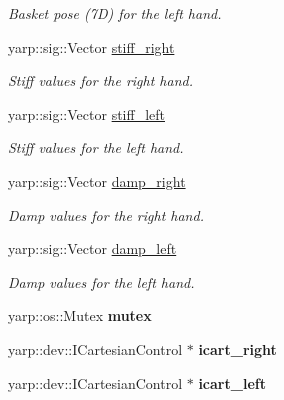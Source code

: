 \begin{DoxyCompactItemize}
\begin{DoxyCompactList}\small\item\em Basket pose (7D) for the left hand. \end{DoxyCompactList}\item 
yarp\+::sig\+::\+Vector \hyperlink{classGraspExecution_a1181e7d2a8259d7bd7386e1efa004901}{stiff\+\_\+right}\label{classGraspExecution_a1181e7d2a8259d7bd7386e1efa004901}

\begin{DoxyCompactList}\small\item\em Stiff values for the right hand. \end{DoxyCompactList}\item 
yarp\+::sig\+::\+Vector \hyperlink{classGraspExecution_aadb33fbb2a639113629e6d2b49c164f4}{stiff\+\_\+left}\label{classGraspExecution_aadb33fbb2a639113629e6d2b49c164f4}

\begin{DoxyCompactList}\small\item\em Stiff values for the left hand. \end{DoxyCompactList}\item 
yarp\+::sig\+::\+Vector \hyperlink{classGraspExecution_a9a2586409693c80b141daa30ae0e1b5b}{damp\+\_\+right}\label{classGraspExecution_a9a2586409693c80b141daa30ae0e1b5b}

\begin{DoxyCompactList}\small\item\em Damp values for the right hand. \end{DoxyCompactList}\item 
yarp\+::sig\+::\+Vector \hyperlink{classGraspExecution_a2a5d14ee157f71328424c9822d48b67a}{damp\+\_\+left}\label{classGraspExecution_a2a5d14ee157f71328424c9822d48b67a}

\begin{DoxyCompactList}\small\item\em Damp values for the left hand. \end{DoxyCompactList}\item 
yarp\+::os\+::\+Mutex {\bfseries mutex}\label{classGraspExecution_a7d77b561dd2573fa42a28b760c030a63}

\item 
yarp\+::dev\+::\+I\+Cartesian\+Control $\ast$ {\bfseries icart\+\_\+right}\label{classGraspExecution_a39489640372dcf1928e854c20742f35e}

\item 
yarp\+::dev\+::\+I\+Cartesian\+Control $\ast$ {\bfseries icart\+\_\+left}\label{classGraspExecution_ad017fcb8fa252d6e1181bafcf2a970e5}


\end{DoxyCompactItemize}
